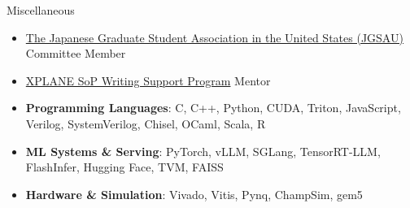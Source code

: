 \documentclass[10pt]{extarticle}
\begin{document}
\noindent Miscellaneous
\begin{itemize}
    \item \href{https://gakuiryugaku.net/english}{The Japanese Graduate Student Association in the United States (JGSAU)} Committee Member 
    \item \href{https://xplane.jp/tag/sop-writing-support/}{XPLANE SoP Writing Support Program} Mentor 
\end{itemize}

\begin{itemize}
    \item {\bf Programming Languages}: C, C++, Python, CUDA, Triton, JavaScript, Verilog, SystemVerilog, Chisel, OCaml, Scala, R
    \item {\bf ML Systems \& Serving}: PyTorch, vLLM, SGLang, TensorRT-LLM, FlashInfer, Hugging Face, TVM, FAISS
    \item {\bf Hardware \& Simulation}: Vivado, Vitis, Pynq, ChampSim, gem5
\end{itemize}

\vspace{3mm}
\end{document}
